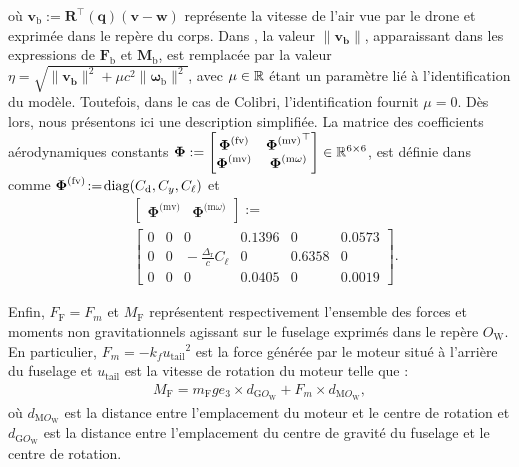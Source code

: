 où $\boldsymbol{v}_{\text{b}} := \boldsymbol{R}^\top(\boldsymbol{q}) (\boldsymbol{v}-\boldsymbol{w})$ représente la vitesse de l'air vue par le drone et exprimée dans le repère du corps. Dans \cite{lustosaHal-03035938}, la valeur $\lVert \boldsymbol{v_{\text{b}}} \rVert$, apparaissant dans les expressions de  $\boldsymbol{F}_{\text{b}}$ et $\boldsymbol{M}_{\text{b}}$, est remplacée par la valeur $\eta = \sqrt{\lVert \boldsymbol{v_{\text{b}}} \rVert^{2} + \mu c^{2} \lVert \boldsymbol{\omega}_{\text{b}} \rVert^{2}}$, avec $\mu \in {\mathbb R}$ étant un paramètre lié à l'identification du modèle. Toutefois, dans le cas de Colibri, l'identification fournit $\mu = 0$. 
Dès lors, nous présentons ici une description simplifiée. La matrice des coefficients aérodynamiques constants 
$\boldsymbol{\Phi}:= \begin{bmatrix} \boldsymbol{\Phi}^{\text{(fv)}} & {\boldsymbol{\Phi}^{\text{(mv)}}}^\top \\ \boldsymbol{\Phi}^{\text{(mv)}} & \boldsymbol{\Phi}^{\text{(m$\omega$)}} \end{bmatrix} \in {\mathbb R}^{6 \times 6}$, est définie dans \cite[eqs. (6)--(9)]{olszaneckibarthHal-02542982} comme $ \boldsymbol{\Phi}^{\text{(fv)}} \!:=\! \operatorname{diag}(C_{\text{d}},C_{y}, C_{\ell})$ et
\begin{align*}
&\left[ \begin{array}{c|c}
    \boldsymbol{\Phi}^{\text{(mv)}}  &  \boldsymbol{\Phi}^{\text{(m$\omega$)}} 
\end{array}\right] :=\\ 
&\left[ \begin{array}{ccc|ccc}
    0 & 0 & 0    &                                          0.1396 & 0 & 0.0573 \\
    0 & 0 & \!\!\!\!\! -\frac{\Delta_{\text{r}}}{c}C_{\ell} &    0 &  0.6358  & 0 \\
    0 & 0 & 0 &     0.0405 & 0 & 0.0019 
\end{array}\right].
\end{align*}




Enfin, $F_{\text{F}} = F_{m}$ et $M_{\text{F}}$ représentent respectivement l'ensemble des forces et moments non gravitationnels agissant sur le fuselage exprimés dans le repère $O_{\text{W}}$. En particulier, $F_{m} = - k_{f} {u_{\text{tail}}}^{2}$ est la force générée par le moteur situé à l'arrière du fuselage et $u_{\text{tail}}$ est la vitesse de rotation du moteur telle que :
\begin{align}
    M_{\text{F}} =  m_{\text{F}} g e_3 \times d_{\text{G}O_{\text{W}}} + F_{m} \times d_{\text{M}O_{\text{W}}},
\end{align}
où $d_{\text{M}O_{\text{W}}}$ est la distance entre l'emplacement du moteur et le centre de rotation et $d_{\text{G}O_{\text{W}}}$ est la distance entre l'emplacement du centre de gravité du fuselage et le centre de rotation.


